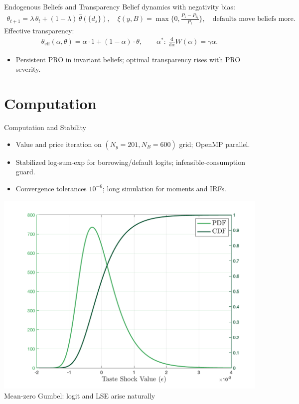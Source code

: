 \documentclass[aspectratio=169,11pt,professionalfonts]{beamer}
\newcommand{\1}{\mathbb{1}}
\begin{document}
\begin{frame}{Endogenous Beliefs and Transparency}
  Belief dynamics with negativity bias:
  \begin{gather*}
    \theta_{t+1}=\lambda\,\theta_t+(1{-}\lambda)\,\widehat\theta(\{d_s\}),\quad
    \xi(y,B)=\max\Big\{0,\tfrac{P_1-P_{\theta_t}}{P_1}\Big\},\quad \text{defaults move beliefs more}.
  \end{gather*}
  Effective transparency:
  \begin{gather*}
    \theta_{\mathrm{eff}}(\alpha,\theta)=\alpha\cdot 1+(1{-}\alpha)\cdot\theta,\qquad
    \alpha^*:\ \frac{\mathrm d}{\mathrm d\alpha}W(\alpha)=\gamma\alpha.
  \end{gather*}
  \begin{itemize}
    \item Persistent PRO in invariant beliefs; optimal transparency rises with PRO
          severity.
  \end{itemize}
\end{frame}

\section{Computation}

\begin{frame}{Computation and Stability}
  \begin{itemize}
    \item Value and price iteration on $(N_y{=}201, N_B{=}600)$ grid; OpenMP parallel.
    \item Stabilized log-sum-exp for borrowing/default logits; infeasible-consumption
          guard.
    \item Convergence tolerances $10^{-6}$; long simulation for moments and IRFs.
  \end{itemize}
  \vspace{0.5em}
  \centering
  \includegraphics[width=0.6\linewidth]{gumbel_distribution.png}
  \\
  {\scriptsize Mean-zero Gumbel: logit and LSE arise naturally}
\end{frame}
\end{document}
